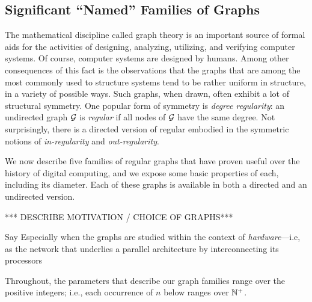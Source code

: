 \subsection{Significant ``Named'' Families of Graphs}
\label{sec:graphs-important-families}

The mathematical discipline called graph theory is an important source
of formal aids for the activities of designing, analyzing, utilizing,
and verifying computer systems.  Of course, computer systems are
designed by humans.  Among other consequences of this fact is the
observations that the graphs that are among the most commonly used to
structure systems tend to be rather uniform in structure, in a variety
of possible ways.  Such graphs, when drawn, often exhibit a lot of
structural symmetry.  One popular form of symmetry is {\it degree
  regularity}: an undirected graph $\mbox{$\cal G$}$ is {\it regular}
 if all nodes of $\mbox{$\cal G$}$ have the same degree.  Not
surprisingly, there is a directed version of regular embodied in the
symmetric notions of {\it in-regularity}
 and {\it out-regularity}.

We now describe five families of regular graphs that have proven
useful over the history of digital computing, and we expose some basic
properties of each, including its diameter.  Each of these graphs is
available in both a directed and an undirected version.

*** DESCRIBE MOTIVATION / CHOICE OF GRAPHS***

Say Especially when the graphs are studied within the context of {\em
  hardware}---i.e, as the network that underlies a parallel
architecture by interconnecting its processors

Throughout, the parameters that describe our graph families range over
the positive integers; i.e., each occurrence of $n$ below ranges over
$\mathbb{N}^+$.

